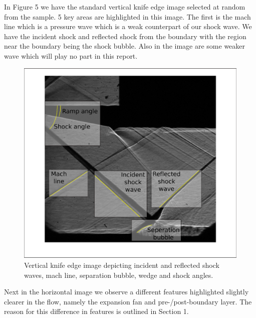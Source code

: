 \documentclass[a4paper,10pt,twoside]{article}
\begin{document}
\begin{multicols}{2}
In Figure 5 we have the standard vertical knife edge image selected at random from the sample. 5 key areas are highlighted in this image. The first is the mach line which is a pressure wave which is a weak counterpart of our shock wave. We have the incident shock and reflected shock from the boundary with the region near the boundary being the shock bubble. Also in the image are some weaker wave which will play no part in this report. \par



\begin{figure}[H]
    \centering
    \includegraphics[width=\linewidth]{vert_highres2.eps}
    \caption{Vertical knife edge image depicting incident and reflected shock waves, mach line, separation bubble, wedge and shock angles.}
    \label{fig:my_label}
\end{figure}



Next in the horizontal image we observe a different features highlighted slightly clearer in the flow, namely the expansion fan and pre-/post-boundary layer. The reason for this difference in features is outlined in Section 1. \par




\end{multicols}
\end{document}

